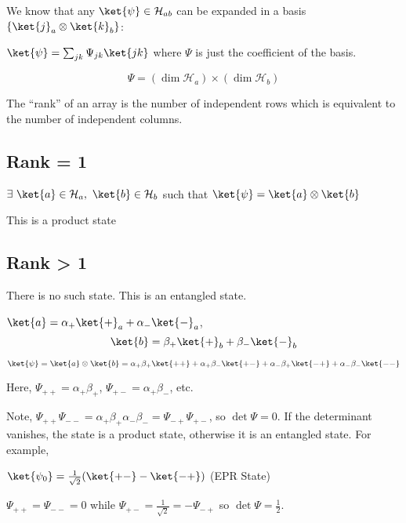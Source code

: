 \documentclass[a4paper,twoside,master.tex]{subfiles}
\begin{document}
We know that any $\ket{\psi}\in\mathcal{H}_{ab}$ can be expanded in
a basis $\{\ket{j}_a\otimes\ket{k}_b\}$:

$\ket{\psi}=\sum_{jk}\Psi_{jk}\ket{jk}$ where $\Psi$ is just the
coefficient of the basis.

\begin{equation}
\Psi = (\dim\mathcal{H}_a)\times(\dim\mathcal{H}_b)
\end{equation}

The ``rank'' of an array is the number of independent rows which is
equivalent to the number of independent columns.

\subsection{Rank = 1}
\label{sub:rank_=_1}


$\exists\ \ket{a}\in\mathcal{H}_a,\ \ket{b}\in\mathcal{H}_b$ such
that $\ket{\psi}=\ket{a}\otimes\ket{b}$

This is a product state

\subsection{Rank \textgreater{} 1}
\label{sub:rank_gt_1}

There is no such state. This is an entangled state.

$\ket{a} = \alpha_+\ket{+}_a+\alpha_-\ket{-}_a$,
\begin{equation}
\ket{b} = \beta_+\ket{+}_b+\beta_-\ket{-}_b
\end{equation}

\begin{equation}
\ket{\psi} = \ket{a}\otimes\ket{b} = \alpha_+\beta_+\ket{++} + \alpha_+\beta_-\ket{+-}+\alpha_-\beta_+\ket{-+} + \alpha_-\beta_-\ket{--}
\end{equation}

Here, $\Psi_{++} = \alpha_+\beta_+$, $\Psi_{+-} = \alpha_+\beta_-$,
etc.

Note,
$\Psi_{++}\Psi_{--} = \alpha_+\beta_+\alpha_-\beta_- = \Psi_{-+}\Psi_{+-}$,
so $\det{\Psi} = 0$. If the determinant vanishes, the state is a
product state, otherwise it is an entangled state. For example,

$\ket{\psi_0} = \frac{1}{\sqrt{2}}(\ket{+-}-\ket{-+})$ (EPR
State)

$\Psi_{++} = \Psi_{--} = 0$ while
$\Psi_{+-} = \frac{1}{\sqrt{2}} = -\Psi_{-+}$ so
$\det{\Psi} = \frac{1}{2}$.
\end{document}
